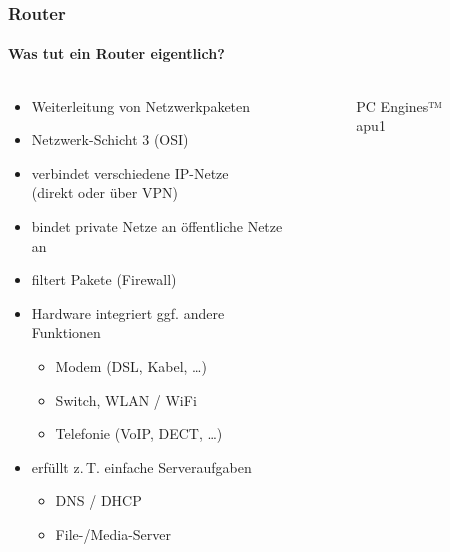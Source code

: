 \documentclass[t]{beamer}
\begin{document}
\begin{frame}
    \frametitle{Router}
    \framesubtitle{Was tut ein Router eigentlich?}
    \begin{columns}[T,onlytextwidth]
        \begin{column}{0.65\textwidth}
            \begin{itemize}
                \item Weiterleitung von Netzwerkpaketen
                \item Netzwerk-Schicht 3 (OSI)
                \item verbindet verschiedene IP-Netze\\(direkt oder über VPN)
                \item bindet private Netze an öffentliche Netze an
                \item filtert Pakete (Firewall)
                \item Hardware integriert ggf. andere Funktionen
                    \begin{itemize}
                        \item Modem (DSL, Kabel, …)
                        \item Switch, WLAN / WiFi
                        \item Telefonie (VoIP, DECT, …)
                    \end{itemize}
                \item erfüllt z.\,T. einfache Serveraufgaben
                    \begin{itemize}
                        \item DNS / DHCP
                        \item File-/Media-Server
                    \end{itemize}
            \end{itemize}
        \end{column}
        \begin{column}{0.35\textwidth}
            \begin{figure}
                \caption{PC Engines™ apu1}
            \end{figure}
        \end{column}
    \end{columns}
\end{frame}
\end{document}
